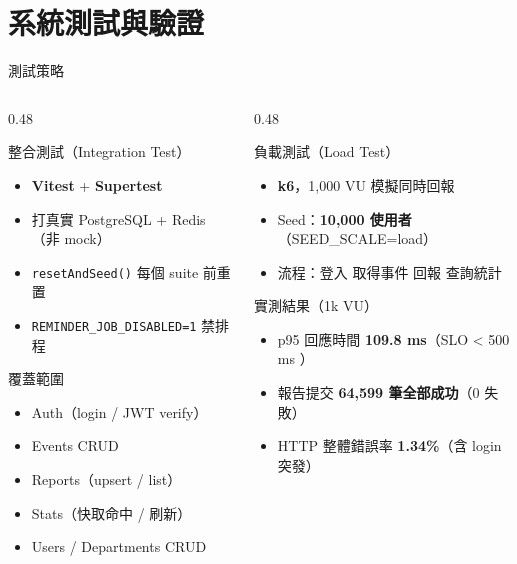 \documentclass[aspectratio=169,12pt]{beamer}
\newcommand{\cmark}{\ding{51}}
\begin{document}
\section{系統測試與驗證}

\begin{frame}[shrink=25]{測試策略}
\begin{columns}[T,onlytextwidth]
\begin{column}{0.48\textwidth}
  \begin{block}{整合測試（Integration Test）}
    \begin{itemize}\small
      \item \textbf{Vitest} + \textbf{Supertest}
      \item 打真實 PostgreSQL + Redis（非 mock）
      \item \texttt{resetAndSeed()} 每個 suite 前重置
      \item \texttt{REMINDER\_JOB\_DISABLED=1} 禁排程
    \end{itemize}
  \end{block}
  \vspace{0.3cm}
  \begin{block}{覆蓋範圍}
    \begin{itemize}\small
      \item Auth（login / JWT verify）
      \item Events CRUD
      \item Reports（upsert / list）
      \item Stats（快取命中 / 刷新）
      \item Users / Departments CRUD
    \end{itemize}
  \end{block}
\end{column}
\begin{column}{0.48\textwidth}
  \begin{block}{負載測試（Load Test）}
    \begin{itemize}\small
      \item \textbf{k6}，1,000 VU 模擬同時回報
      \item Seed：\textbf{10,000 使用者}（SEED\_SCALE=load）
      \item 流程：登入 \textrightarrow{} 取得事件 \textrightarrow{} 回報 \textrightarrow{} 查詢統計
    \end{itemize}
  \end{block}
  \vspace{0.3cm}
  \begin{exampleblock}{實測結果（1k VU）}
    \begin{itemize}\small
      \item p95 回應時間 \textbf{109.8 ms}（SLO \textless{} 500 ms \textcolor{msuccess}{\cmark}）
      \item 報告提交 \textbf{64,599 筆全部成功}（0 失敗）
      \item HTTP 整體錯誤率 \textbf{1.34\%}（含 login 突發）
    \end{itemize}
  \end{exampleblock}
\end{column}
\end{columns}
\end{frame}
\end{document}
